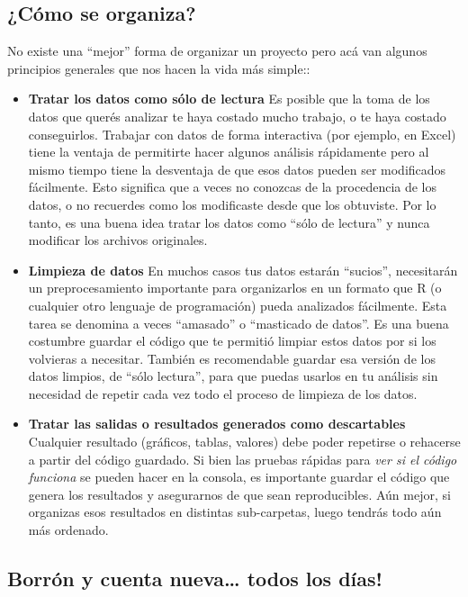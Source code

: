 \documentclass[
  openany]{book}
\providecommand{\tightlist}{%
  \setlength{\itemsep}{0pt}\setlength{\parskip}{0pt}}
\begin{document}
\hypertarget{cuxf3mo-se-organiza}{%
\subsection{¿Cómo se organiza?}\label{cuxf3mo-se-organiza}}

No existe una ``mejor'' forma de organizar un proyecto pero acá van algunos principios generales que nos hacen la vida más simple::

\begin{itemize}
\tightlist
\item
  \textbf{Tratar los datos como sólo de lectura} Es posible que la toma de los datos que querés analizar te haya costado mucho trabajo, o te haya costado conseguirlos. Trabajar con datos de forma interactiva (por ejemplo, en Excel) tiene la ventaja de permitirte hacer algunos análisis rápidamente pero al mismo tiempo tiene la desventaja de que esos datos pueden ser modificados fácilmente. Esto significa que a veces no conozcas de la procedencia de los datos, o no recuerdes como los modificaste desde que los obtuviste. Por lo tanto, es una buena idea tratar los datos como ``sólo de lectura'' y nunca modificar los archivos originales.
\item
  \textbf{Limpieza de datos} En muchos casos tus datos estarán ``sucios'', necesitarán un preprocesamiento importante para organizarlos en un formato que R (o cualquier otro lenguaje de programación) pueda analizados fácilmente. Esta tarea se denomina a veces ``amasado'' o ``masticado de datos''. Es una buena costumbre guardar el código que te permitió limpiar estos datos por si los volvieras a necesitar. También es recomendable guardar esa versión de los datos limpios, de ``sólo lectura'', para que puedas usarlos en tu análisis sin necesidad de repetir cada vez todo el proceso de limpieza de los datos.
\item
  \textbf{Tratar las salidas o resultados generados como descartables} Cualquier resultado (gráficos, tablas, valores) debe poder repetirse o rehacerse a partir del código guardado. Si bien las pruebas rápidas para \emph{ver si el código funciona} se pueden hacer en la consola, es importante guardar el código que genera los resultados y asegurarnos de que sean reproducibles. Aún mejor, si organizas esos resultados en distintas sub-carpetas, luego tendrás todo aún más ordenado.
\end{itemize}

\hypertarget{borruxf3n-y-cuenta-nueva-todos-los-duxedas}{%
\subsection{Borrón y cuenta nueva\ldots{} todos los días!}\label{borruxf3n-y-cuenta-nueva-todos-los-duxedas}}
\end{document}
